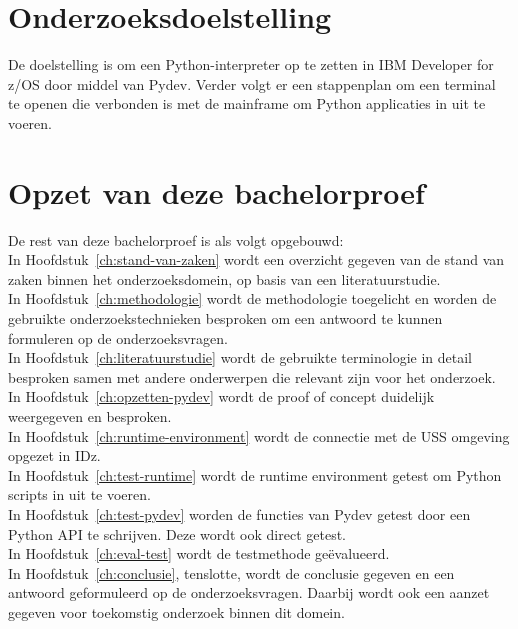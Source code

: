 \section{Onderzoeksdoelstelling}%
\label{sec:onderzoeksdoelstelling}
De doelstelling is om een Python-interpreter op te zetten in IBM Developer for z/OS door middel van Pydev. Verder volgt er een stappenplan om een terminal te openen die verbonden is met de mainframe om Python applicaties in uit te voeren.

\section{Opzet van deze bachelorproef}%
\label{sec:opzet-bachelorproef}


De rest van deze bachelorproef is als volgt opgebouwd: \\

In Hoofdstuk~\ref{ch:stand-van-zaken} wordt een overzicht gegeven van de stand van zaken binnen het onderzoeksdomein, op basis van een literatuurstudie. \\

In Hoofdstuk~\ref{ch:methodologie} wordt de methodologie toegelicht en worden de gebruikte onderzoekstechnieken besproken om een antwoord te kunnen formuleren op de onderzoeksvragen. \\

In Hoofdstuk~\ref{ch:literatuurstudie} wordt de gebruikte terminologie in detail besproken samen met andere onderwerpen die relevant zijn voor het onderzoek. \\

In Hoofdstuk~\ref{ch:opzetten-pydev} wordt de proof of concept duidelijk weergegeven en besproken. \\

In Hoofdstuk~\ref{ch:runtime-environment} wordt de connectie met de USS omgeving opgezet in IDz. \\

In Hoofdstuk~\ref{ch:test-runtime} wordt de runtime environment getest om Python scripts in uit te voeren. \\

In Hoofdstuk~\ref{ch:test-pydev} worden de functies van Pydev getest door een Python API te schrijven. Deze wordt ook direct getest. \\

In Hoofdstuk~\ref{ch:eval-test} wordt de testmethode geëvalueerd. \\

In Hoofdstuk~\ref{ch:conclusie}, tenslotte, wordt de conclusie gegeven en een antwoord geformuleerd op de onderzoeksvragen. Daarbij wordt ook een aanzet gegeven voor toekomstig onderzoek binnen dit domein.